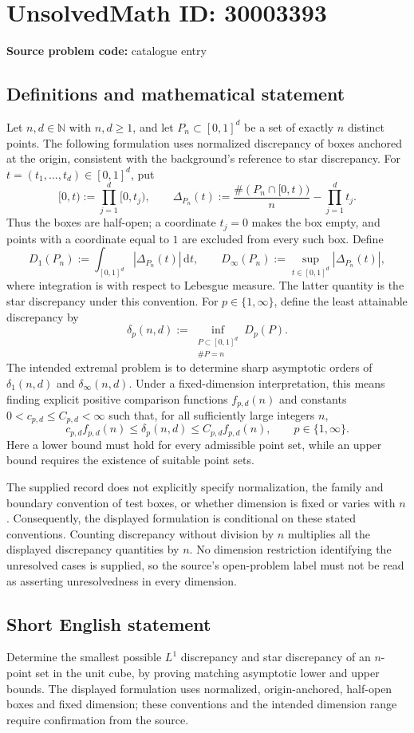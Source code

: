\documentclass[11pt]{article}
\newcommand{\N}{\mathbb{N}}
\begin{document}
\section*{UnsolvedMath ID: 30003393}
\textbf{Source problem code:} catalogue entry
\subsection{Definitions and mathematical statement}
Let \(n,d\in\N\) with \(n,d\geq1\), and let \(P_n\subset[0,1]^d\) be a set of exactly \(n\) distinct points. The following formulation uses normalized discrepancy of boxes anchored at the origin, consistent with the background's reference to star discrepancy. For \(t=(t_1,\ldots,t_d)\in[0,1]^d\), put
\[
[0,t):=\prod_{j=1}^d[0,t_j),\qquad
\Delta_{P_n}(t):=\frac{\#(P_n\cap[0,t))}{n}-\prod_{j=1}^d t_j.
\]
Thus the boxes are half-open; a coordinate \(t_j=0\) makes the box empty, and points with a coordinate equal to \(1\) are excluded from every such box. Define
\[
D_1(P_n):=\int_{[0,1]^d}|\Delta_{P_n}(t)|\,\mathrm{d}t,
\qquad
D_\infty(P_n):=\sup_{t\in[0,1]^d}|\Delta_{P_n}(t)|,
\]
where integration is with respect to Lebesgue measure. The latter quantity is the star discrepancy under this convention. For \(p\in\{1,\infty\}\), define the least attainable discrepancy by
\[
\delta_p(n,d):=\inf_{\substack{P\subset[0,1]^d\\\#P=n}}D_p(P).
\]
The intended extremal problem is to determine sharp asymptotic orders of \(\delta_1(n,d)\) and \(\delta_\infty(n,d)\). Under a fixed-dimension interpretation, this means finding explicit positive comparison functions \(f_{p,d}(n)\) and constants \(0<c_{p,d}\leq C_{p,d}<\infty\) such that, for all sufficiently large integers \(n\),
\[
c_{p,d}f_{p,d}(n)\leq\delta_p(n,d)\leq C_{p,d}f_{p,d}(n),
\qquad p\in\{1,\infty\}.
\]
Here a lower bound must hold for every admissible point set, while an upper bound requires the existence of suitable point sets.

The supplied record does not explicitly specify normalization, the family and boundary convention of test boxes, or whether dimension is fixed or varies with \(n\). Consequently, the displayed formulation is conditional on these stated conventions. Counting discrepancy without division by \(n\) multiplies all the displayed discrepancy quantities by \(n\). No dimension restriction identifying the unresolved cases is supplied, so the source's open-problem label must not be read as asserting unresolvedness in every dimension.
\subsection{Short English statement}
Determine the smallest possible \(L^1\) discrepancy and star discrepancy of an \(n\)-point set in the unit cube, by proving matching asymptotic lower and upper bounds. The displayed formulation uses normalized, origin-anchored, half-open boxes and fixed dimension; these conventions and the intended dimension range require confirmation from the source.
\end{document}
